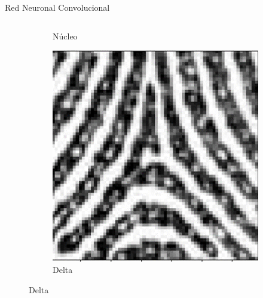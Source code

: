 \documentclass[12pt,aspectratio=169]{beamer}
\begin{document}
\begin{frame}{Red Neuronal Convolucional}
\begin{columns}[c]
\begin{itemize}
\begin{figure}
\begin{subfigure}{0.21\textwidth}
                        \caption{Núcleo}
                    \end{subfigure}
                    \begin{subfigure}{0.21\textwidth}
                        \centering
                        \includegraphics[scale=0.1]{figs/fhl_1.png}
                        \caption{Delta}
                    \end{subfigure}
                \end{figure}
                \vspace{3mm}
                
            \end{itemize}
    \end{columns}

\end{frame}
\end{document}
